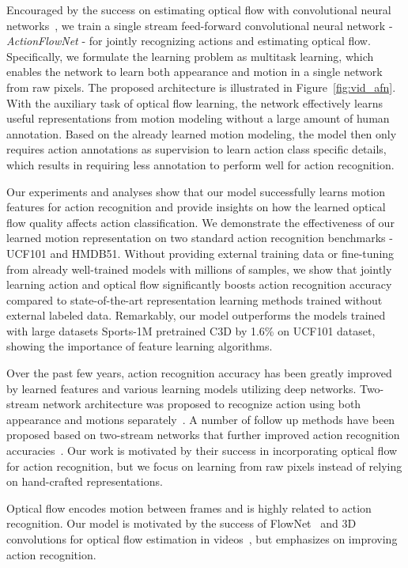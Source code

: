 \documentclass[10pt,twocolumn,letterpaper]{article}
\begin{document}
Encouraged by the success on estimating optical flow with convolutional neural networks~\cite{FischerDIHHGSCB15}, we train a single stream feed-forward convolutional neural network - \mbox{\emph{ActionFlowNet}} - for jointly recognizing actions and estimating optical flow.
Specifically, we formulate the learning problem as multitask learning, which enables the network to learn both appearance and motion in a single network from raw pixels.
The proposed architecture is illustrated in Figure~\ref{fig:vid_afn}.
With the auxiliary task of optical flow learning, the network effectively learns useful representations from motion modeling without a large amount of human annotation.
Based on the already learned motion modeling, the model then only requires action annotations as supervision to learn action class specific details, which results in requiring less annotation to perform well for action recognition.

Our experiments and analyses show that our model successfully learns motion features for action recognition and provide insights on how the learned optical flow quality affects action classification.
We demonstrate the effectiveness of our learned motion representation on two standard action recognition benchmarks - UCF101 and HMDB51.
Without providing external training data or fine-tuning from already well-trained models with millions of samples, we show that jointly learning action and optical flow significantly boosts action recognition accuracy compared to state-of-the-art representation learning methods trained without external labeled data.
Remarkably, our model outperforms the models trained with large datasets Sports-1M pretrained C3D by 1.6\% on UCF101 dataset, showing the importance of feature learning algorithms.

Over the past few years, action recognition accuracy has been greatly improved by learned features and various learning models utilizing deep networks.
Two-stream network architecture was proposed to recognize action using both appearance and motions separately~\cite{simonyanZ14a}.
A number of follow up methods have been proposed based on two-stream networks that further improved action recognition accuracies~\cite{feichtenhofer2016convolutional,wang2016actions,wangXWQLTV16,feichtenhofer2016spatiotemporal,ng2018tdn}.
Our work is motivated by their success in incorporating optical flow for action recognition, but we focus on learning from raw pixels instead of relying on hand-crafted representations.

Optical flow encodes motion between frames and is highly related to action recognition.
Our model is motivated by the success of FlowNet~\cite{FischerDIHHGSCB15} and 3D convolutions for optical flow estimation in videos~\cite{tranbftp16}, but emphasizes on improving action recognition.
\end{document}
